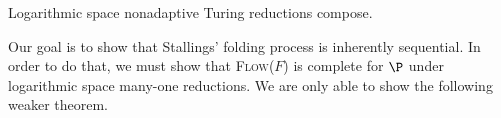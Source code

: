 \documentclass{article}
\newcommand{\Flow}{\textsc{Flow($F$)}}
\begin{document}
\begin{lemma}\label{lem:compose}
  Logarithmic space nonadaptive Turing reductions compose.
\end{lemma}


Our goal is to show that Stallings' folding process is inherently sequential.
In order to do that, we must show that \Flow{} is complete for $\P$ under logarithmic space many-one reductions.
We are only able to show the following weaker theorem.
\end{document}
